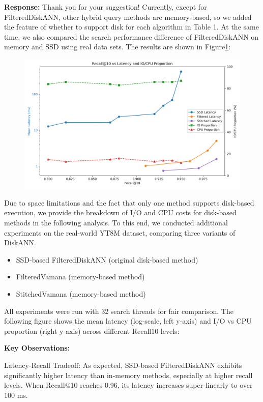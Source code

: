 \documentclass[sigconf, nonacm]{acmart}
\begin{document}
\noindent
\textbf{Response:} 
Thank you for your suggestion! Currently, except for FilteredDiskANN, other hybrid query methods are memory-based, so we added the feature of whether to support disk for each algorithm in Table 1. At the same time, we also compared the search performance difference of FilteredDiskANN on memory and SSD using real data sets. The results are shown in Figure\ref{fig:recall-latency}:
\begin{figure}[htbp]
	\centering
	\includegraphics[width=\linewidth]{fig/recall_latency_all.png}
	\caption{}
	\label{fig:recall-latency}
\end{figure}

Due to space limitations and the fact that only one method supports disk-based execution, we provide the breakdown of I/O and CPU costs for disk-based methods in the following analysis. To this end, we conducted additional experiments on the real-world YT8M dataset, comparing three variants of DiskANN.



\begin{itemize}
	\item SSD-based FilteredDiskANN (original disk-based method)
	\item FilteredVamana (memory-based method)
	\item StitchedVamana (memory-based method)
\end{itemize}


All experiments were run with 32 search threads for fair comparison. The following figure shows the mean latency (log-scale, left y-axis) and I/O vs CPU proportion (right y-axis) across different Recall\@10 levels:

\textbf{ Key Observations:}

Latency-Recall Tradeoff:
As expected, SSD-based FilteredDiskANN exhibits significantly higher latency than in-memory methods, especially at higher recall levels. When Recall@10 reaches 0.96, its latency increases super-linearly to over 100 ms.
\end{document}
